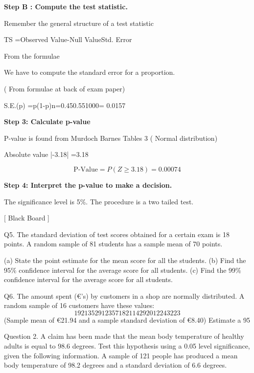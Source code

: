 



\noindent \textbf{Step B : Compute the test statistic.}

Remember the general structure of a test statistic

TS =Observed Value-Null ValueStd. Error 



From the formulae

We have to compute the standard error for a proportion. 

( From formulae at back of exam paper)

S.E.(p) =p(1-p)n=0.450.551000= 0.0157




\noindent \textbf{Step 3: Calculate p-value}

P-value is found from Murdoch Barnes Tables 3 ( Normal distribution)

Absolute value  |-3.18| =3.18




\[ \mbox{P-Value} = P(Z \geq 3.18) = 0.00074\]


\noindent \textbf{Step 4: Interpret the p-value to make a decision.}

The significance level is 5\%.  The procedure is a two tailed test.


[ Black Board ]

\newpage
Q5. The standard deviation of test scores obtained for a certain exam is 18 points. 
A random sample of 81 students has a sample mean of 70 points.

(a) State the point estimate for the mean score for all the students.
(b) Find the 95\% confidence interval for the average score for all students.
(c) Find the 99\% confidence interval for the average score for all students.

Q6. The amount spent (€’s) by customers in a shop are normally distributed. 
A random sample of 16 customers have these values:
\[19 21 35 29 12 35 7 18 21 14 29 20 12 24 32 23\]
(Sample  mean of €21.94 and a sample standard deviation of €8.40) 
Estimate a 95%




\newpage


Question 2.
A claim has been made that the mean body temperature of healthy adults is equal to 98.6 degrees. 
Test this hypothesis using a 0.05 level significance, given the following information.
A sample of 121 people has produced a mean body temperature of 98.2 degrees and a standard deviation of 6.6 degrees.  

